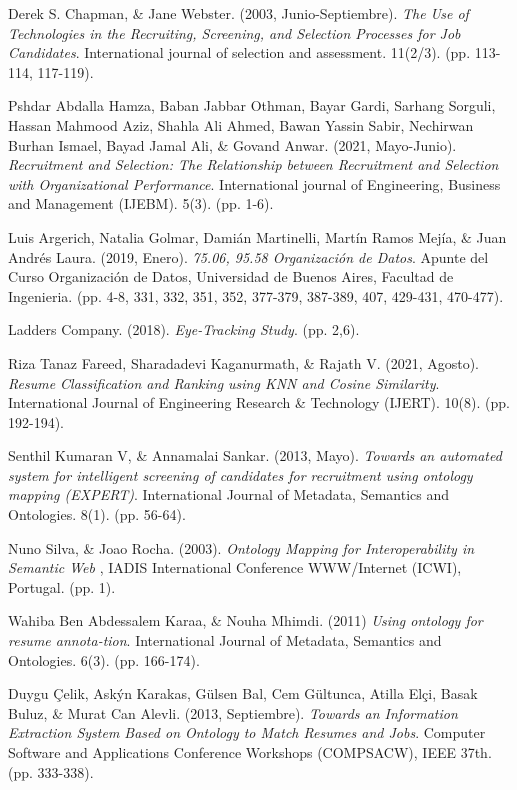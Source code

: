 \documentclass[12pt,a4paper]{article}
\begin{document}
\begin{sloppypar}
\begin{thebibliography}{9}
Derek S. Chapman, \& Jane Webster. (2003, Junio-Septiembre). \textit{The Use of Technologies in the Recruiting, Screening, and Selection Processes for Job Candidates}. International journal of selection and assessment. 11(2/3). (pp. 113-114, 117-119).

Pshdar Abdalla Hamza, Baban Jabbar Othman, Bayar Gardi, Sarhang Sorguli, Hassan Mahmood Aziz, Shahla Ali Ahmed, Bawan Yassin Sabir, Nechirwan Burhan Ismael, Bayad Jamal Ali, \& Govand Anwar. (2021, Mayo-Junio).
\textit{Recruitment and Selection: The Relationship between Recruitment and Selection with Organizational Performance}. International journal of Engineering, Business and Management (IJEBM). 5(3). (pp. 1-6).

Luis Argerich, Natalia Golmar, Damián Martinelli, Martín Ramos Mejía, \& Juan Andrés Laura. (2019, Enero). \textit{75.06, 95.58 Organización de Datos}. Apunte del Curso Organización de Datos, Universidad de Buenos Aires, Facultad de Ingenieria. (pp. 4-8, 331, 332, 351, 352, 377-379, 387-389, 407, 429-431, 470-477).

Ladders Company. (2018). \textit{Eye-Tracking Study}. (pp. 2,6).

Riza Tanaz Fareed, Sharadadevi Kaganurmath, \& Rajath V. (2021, Agosto). \textit{Resume Classification and Ranking using KNN and Cosine Similarity}. International Journal of Engineering Research \& Technology (IJERT). 10(8). (pp. 192-194).

Senthil Kumaran V, \& Annamalai Sankar. (2013, Mayo). \textit{Towards an automated system for intelligent screening of candidates for recruitment using ontology mapping (EXPERT)}. International Journal of Metadata, Semantics and Ontologies. 8(1). (pp. 56-64).

Nuno Silva, \& Joao Rocha. (2003). \textit{Ontology Mapping for Interoperability in Semantic Web} , IADIS International Conference WWW/Internet (ICWI), Portugal. (pp. 1).

Wahiba Ben Abdessalem Karaa, \& Nouha Mhimdi. (2011) \textit{Using ontology for resume annota-tion}. International Journal of Metadata, Semantics and Ontologies. 6(3). (pp. 166-174).

Duygu Çelik, Askýn Karakas, Gülsen Bal, Cem Gültunca, Atilla Elçi, Basak Buluz, \& Murat Can Alevli. (2013, Septiembre). \textit{Towards an Information Extraction System Based on Ontology to Match Resumes and Jobs}. Computer Software and Applications Conference Workshops (COMPSACW), IEEE 37th. (pp. 333-338).


\end{thebibliography}
\end{sloppypar}
\end{document}
